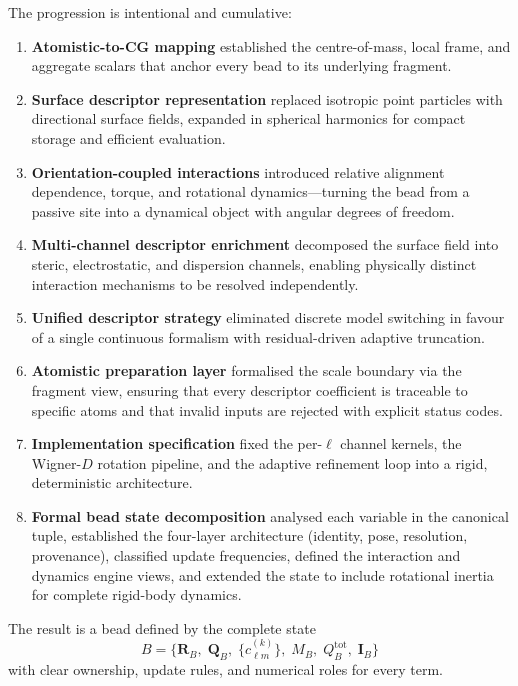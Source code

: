 \documentclass[11pt]{article}
\begin{document}
The progression is intentional and cumulative:
\begin{enumerate}
    \item \textbf{Atomistic-to-CG mapping} established the centre-of-mass,
          local frame, and aggregate scalars that anchor every bead to its
          underlying fragment.
    \item \textbf{Surface descriptor representation} replaced isotropic
          point particles with directional surface fields, expanded in
          spherical harmonics for compact storage and efficient evaluation.
    \item \textbf{Orientation-coupled interactions} introduced relative
          alignment dependence, torque, and rotational dynamics---turning
          the bead from a passive site into a dynamical object with angular
          degrees of freedom.
    \item \textbf{Multi-channel descriptor enrichment} decomposed the
          surface field into steric, electrostatic, and dispersion channels,
          enabling physically distinct interaction mechanisms to be resolved
          independently.
    \item \textbf{Unified descriptor strategy} eliminated discrete model
          switching in favour of a single continuous formalism with
          residual-driven adaptive truncation.
    \item \textbf{Atomistic preparation layer} formalised the scale boundary
          via the fragment view, ensuring that every descriptor coefficient
          is traceable to specific atoms and that invalid inputs are rejected
          with explicit status codes.
    \item \textbf{Implementation specification} fixed the per-$\ell$
          channel kernels, the Wigner-$D$ rotation pipeline, and the
          adaptive refinement loop into a rigid, deterministic architecture.
    \item \textbf{Formal bead state decomposition} analysed each variable in
          the canonical tuple, established the four-layer architecture
          (identity, pose, resolution, provenance), classified update
          frequencies, defined the interaction and dynamics engine views,
          and extended the state to include rotational inertia for complete
          rigid-body dynamics.
\end{enumerate}

The result is a bead defined by the complete state
\begin{equation}
    B = \bigl\{
        \mathbf{R}_B,\;
        \mathbf{Q}_B,\;
        \{c_{\ell m}^{(k)}\},\;
        M_B,\;
        Q_B^{\mathrm{tot}},\;
        \mathbf{I}_B
    \bigr\}
\end{equation}
with clear ownership, update rules, and numerical roles for every term.
\end{document}
